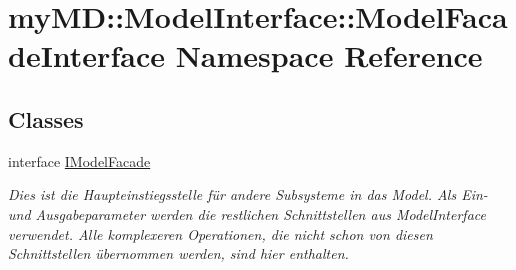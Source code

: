 \hypertarget{namespacemy_m_d_1_1_model_interface_1_1_model_facade_interface}{
\section{my\-MD::Model\-Interface::Model\-Facade\-Interface Namespace Reference}
\label{d4/d96/namespacemy_m_d_1_1_model_interface_1_1_model_facade_interface}
}


\subsection*{Classes}
\begin{CompactItemize}
\item 
interface \hyperlink{interfacemy_m_d_1_1_model_interface_1_1_model_facade_interface_1_1_i_model_facade}{IModel\-Facade}
\begin{CompactList}\small\item\em Dies ist die Haupteinstiegsstelle f\"{u}r andere Subsysteme in das Model. Als Ein- und Ausgabeparameter werden die restlichen Schnittstellen aus Model\-Interface verwendet. Alle komplexeren Operationen, die nicht schon von diesen Schnittstellen \"{u}bernommen werden, sind hier enthalten. \item\end{CompactList}\end{CompactItemize}
